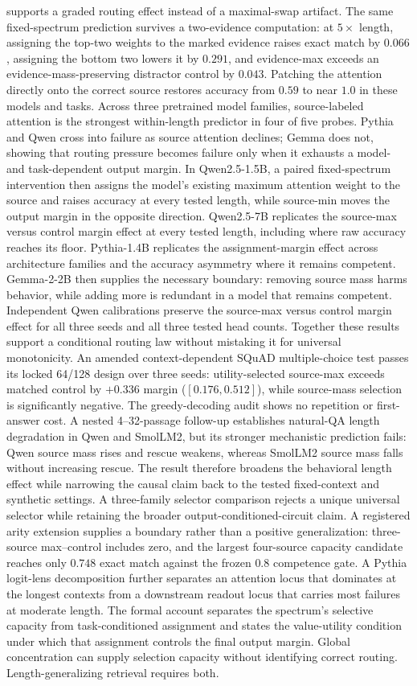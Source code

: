 \documentclass[letterpaper]{article} %
\begin{document}
supports a graded routing effect instead of a maximal-swap artifact.
The same fixed-spectrum prediction survives a two-evidence computation: at $5\times$ length, assigning the
top-two weights to the marked evidence raises exact match by $0.066$, assigning the bottom two lowers it by
$0.291$, and evidence-max exceeds an evidence-mass-preserving distractor control by $0.043$.
Patching the attention directly onto the correct source restores accuracy from $0.59$ to near $1.0$ in these
models and tasks.
Across three pretrained model families, source-labeled attention is the strongest within-length predictor
in four of five probes.
Pythia and Qwen cross into failure as source attention declines; Gemma does not, showing that routing
pressure becomes failure only when it exhausts a model- and task-dependent output margin.
In Qwen2.5-1.5B, a paired fixed-spectrum intervention then assigns the model's existing maximum attention
weight to the source and raises accuracy at every tested length, while source-min moves the output margin in
the opposite direction. Qwen2.5-7B replicates the source-max versus control margin effect at every tested
length, including where raw accuracy reaches its floor. Pythia-1.4B replicates the assignment-margin effect
across architecture families and the accuracy asymmetry where it remains competent. Gemma-2-2B then supplies
the necessary boundary: removing source mass harms behavior, while adding more is redundant in a model that
remains competent. Independent Qwen calibrations preserve the source-max versus control margin effect for
all three seeds and all three tested head counts. Together these results support a conditional routing law
without mistaking it for universal monotonicity.
An amended context-dependent SQuAD multiple-choice test passes its locked 64/128 design over three seeds:
utility-selected source-max exceeds matched control by $+0.336$ margin ($[0.176,0.512]$), while source-mass
selection is significantly negative. The greedy-decoding audit shows no repetition or first-answer cost.
A nested 4--32-passage follow-up establishes natural-QA length degradation in Qwen and SmolLM2, but its
stronger mechanistic prediction fails: Qwen source mass rises and rescue weakens, whereas SmolLM2 source mass
falls without increasing rescue. The result therefore broadens the behavioral length effect while narrowing
the causal claim back to the tested fixed-context and synthetic settings.
A three-family selector comparison rejects a unique universal selector while retaining the broader
output-conditioned-circuit claim. A registered arity extension supplies a boundary rather than a positive
generalization: three-source max--control includes zero, and the largest four-source capacity candidate
reaches only $0.748$ exact match against the frozen $0.8$ competence gate.
A Pythia logit-lens decomposition further separates an attention locus that dominates at the longest
contexts from a downstream readout locus that carries most failures at moderate length.
The formal account separates the spectrum's selective capacity from task-conditioned assignment and states
the value-utility condition under which that assignment controls the final output margin.
Global concentration can supply selection capacity without identifying correct routing.
Length-generalizing retrieval requires both.
\end{document}
